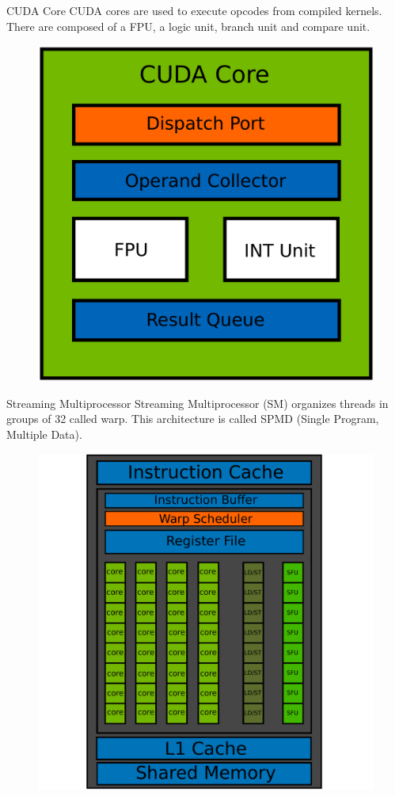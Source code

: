 \documentclass{beamer}
\begin{document}
\begin{frame}{CUDA Core}
	CUDA cores are used to execute opcodes from compiled kernels. There are composed of a FPU, a logic unit, branch unit and compare unit.
	\begin{figure}
		\includegraphics[scale=0.2]{figures/cudacore.pdf}
	\end{figure}
\end{frame}

\begin{frame}{Streaming Multiprocessor}
	Streaming Multiprocessor (SM) organizes threads in groups of 32 called warp. This architecture is called SPMD (Single Program, Multiple Data).
	\begin{figure}
		\includegraphics[scale=0.3]{figures/warp.pdf}
	\end{figure}
\end{frame}
\end{document}
